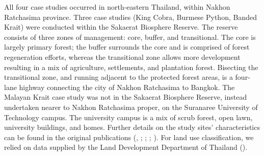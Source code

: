 \documentclass[10pt,a4paper]{article}
\begin{document}
All four case studies occurred in north-eastern Thailand, within Nakhon Ratchasima province.
Three case studies (King Cobra, Burmese Python, Banded Krait) were conducted within the Sakaerat Biosphere Reserve.
The reserve consists of three zones of management: core, buffer, and transitional.
The core is largely primary forest; the buffer surrounds the core and is comprised of forest regeneration efforts, whereas the transitional zone allows more development resulting in a mix of agriculture, settlements, and plantation forest.
Bisecting the transitional zone, and running adjacent to the protected forest areas, is a four-lane highway connecting the city of Nakhon Ratchasima to Bangkok.
The Malayan Krait case study was not in the Sakaerat Biosphere Reserve, instead undertaken nearer to Nakhon Ratchasima proper, on the Suranaree University of Technology campus.
The university campus is a mix of scrub forest, open lawn, university buildings, and homes.
Further details on the study sites' characteristics can be found in the original publications (, ; ; ; ).
For land use classification, we relied on data supplied by the Land Development Department of Thailand ().
\end{document}
